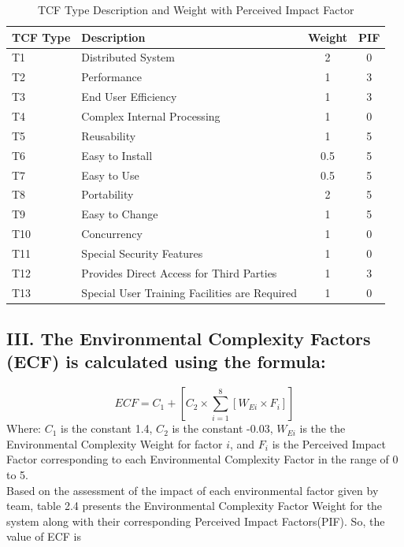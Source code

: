 \documentclass[english,12pt,a4paper]{report}
\begin{document}
	
	\begin{table}[htbp]
		\centering
		\begin{tabular}{@{}llcc@{}}
			\toprule
			TCF Type & Description & Weight & PIF \\ 
			\midrule
			T1 & Distributed System & 2 & 0\\ 
			T2 & Performance & 1 & 3\\ 
			T3 & End User Efficiency & 1 & 3\\ 
			T4 & Complex Internal Processing & 1 & 0\\ 
			T5 & Reusability & 1 & 5\\ 
			T6 & Easy to Install & 0.5 & 5\\ 
			T7 & Easy to Use & 0.5 & 5\\ 
			T8 & Portability & 2 & 5\\ 
			T9 & Easy to Change & 1 & 5\\ 
			T10 & Concurrency & 1 & 0\\ 
			T11 & Special Security Features & 1 & 0\\ 
			T12 & Provides Direct Access for Third Parties & 1 & 3\\ 
			T13 & Special User Training Facilities are Required & 1 & 0\\ 
			\bottomrule
		\end{tabular}
		\caption{TCF Type Description and Weight with Perceived Impact Factor}
		\label{tab:tcf_table}
	\end{table}
	
	
	
	\subsection*{III. The Environmental Complexity Factors (ECF) is calculated using the formula:}
	\begin{equation}
		ECF = C_{1} + \left[C_{2} \times \sum_{i=1}^{8} \left[W_{Ei} \times F_i\right]\right]
	\end{equation}
	Where:
	\( C_{1} \) is the constant 1.4,
	\( C_{2} \) is the constant -0.03,
	\( W_{Ei} \) is the the Environmental Complexity Weight for factor \( i \), and
	\( F_i \) is the Perceived Impact Factor corresponding to each Environmental Complexity Factor in the range of 0 to 5. \\
	Based on the assessment of the impact of each environmental factor given by team, table 2.4 presents the Environmental Complexity Factor Weight for the system along with their corresponding Perceived Impact Factors(PIF). So, the value of ECF is
	
\end{document}
